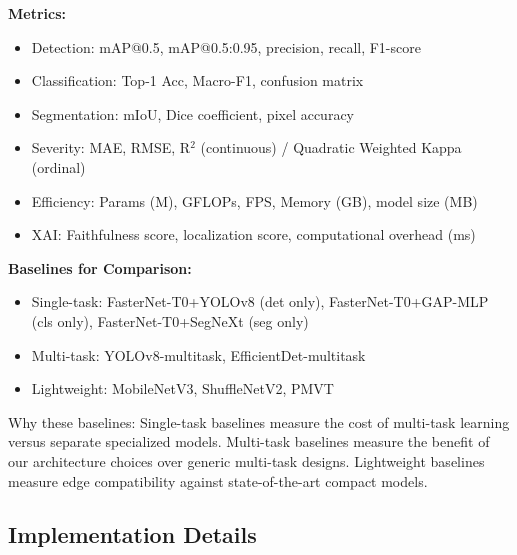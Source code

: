 \documentclass[10pt,a4paper,twocolumn]{article}
\begin{document}
\textbf{Metrics:}
\begin{itemize}
    \item Detection: mAP@0.5, mAP@0.5:0.95, precision, recall, F1-score
    \item Classification: Top-1 Acc, Macro-F1, confusion matrix
    \item Segmentation: mIoU, Dice coefficient, pixel accuracy
    \item Severity: MAE, RMSE, R$^2$ (continuous) / Quadratic Weighted Kappa (ordinal)
    \item Efficiency: Params (M), GFLOPs, FPS, Memory (GB), model size (MB)
    \item XAI: Faithfulness score, localization score, computational overhead (ms)
\end{itemize}

\textbf{Baselines for Comparison:}
\begin{itemize}
    \item Single-task: FasterNet-T0+YOLOv8 (det only), FasterNet-T0+GAP-MLP (cls only), FasterNet-T0+SegNeXt (seg only)
    \item Multi-task: YOLOv8-multitask, EfficientDet-multitask
    \item Lightweight: MobileNetV3, ShuffleNetV2, PMVT \cite{li2023pmvt}
\end{itemize}

Why these baselines: Single-task baselines measure the cost of multi-task learning versus separate specialized models. Multi-task baselines measure the benefit of our architecture choices over generic multi-task designs. Lightweight baselines measure edge compatibility against state-of-the-art compact models.

\subsection{Implementation Details}
\end{document}
